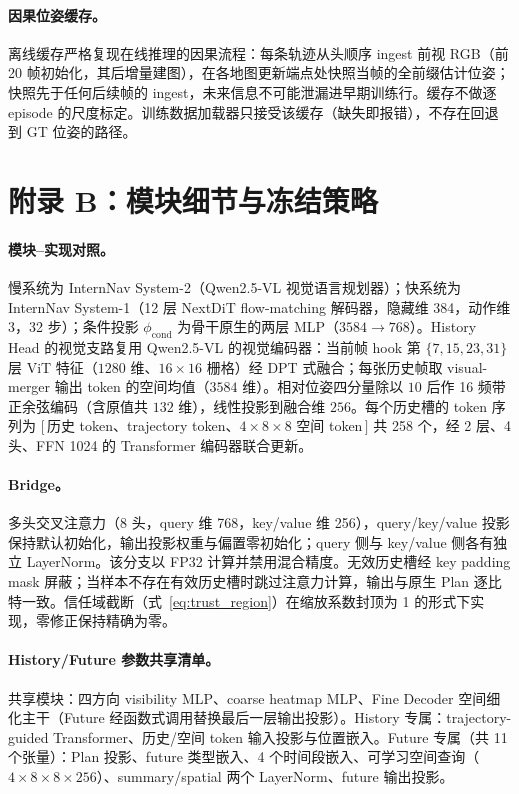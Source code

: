 \documentclass[10pt]{ctexart}
\begin{document}
\paragraph{因果位姿缓存。}
离线缓存严格复现在线推理的因果流程：每条轨迹从头顺序 ingest 前视 RGB（前 20 帧初始化，其后增量建图），在各地图更新端点处快照当帧的全前缀估计位姿；快照先于任何后续帧的 ingest，未来信息不可能泄漏进早期训练行。缓存不做逐 episode 的尺度标定。训练数据加载器只接受该缓存（缺失即报错），不存在回退到 GT 位姿的路径。

\section*{附录 B：模块细节与冻结策略}

\paragraph{模块--实现对照。}
慢系统为 InternNav System-2（Qwen2.5-VL 视觉语言规划器）；快系统为 InternNav System-1（12 层 NextDiT flow-matching 解码器，隐藏维 384，动作维 3，32 步）；条件投影 $\phi_{\mathrm{cond}}$ 为骨干原生的两层 MLP（$3584\!\to\!768$）。History Head 的视觉支路复用 Qwen2.5-VL 的视觉编码器：当前帧 hook 第 $\{7,15,23,31\}$ 层 ViT 特征（$1280$ 维、$16\times16$ 栅格）经 DPT 式融合；每张历史帧取 visual-merger 输出 token 的空间均值（$3584$ 维）。相对位姿四分量除以 $10$ 后作 16 频带正余弦编码（含原值共 $132$ 维），线性投影到融合维 $256$。每个历史槽的 token 序列为 $[\,$历史 token、trajectory token、$4\times8\times8$ 空间 token$\,]$ 共 258 个，经 2 层、4 头、FFN 1024 的 Transformer 编码器联合更新。

\paragraph{Bridge。}
多头交叉注意力（8 头，query 维 768，key/value 维 256），query/key/value 投影保持默认初始化，输出投影权重与偏置零初始化；query 侧与 key/value 侧各有独立 LayerNorm。该分支以 FP32 计算并禁用混合精度。无效历史槽经 key padding mask 屏蔽；当样本不存在有效历史槽时跳过注意力计算，输出与原生 Plan 逐比特一致。信任域截断（式~\ref{eq:trust_region}）在缩放系数封顶为 1 的形式下实现，零修正保持精确为零。

\paragraph{History/Future 参数共享清单。}
共享模块：四方向 visibility MLP、coarse heatmap MLP、Fine Decoder 空间细化主干（Future 经函数式调用替换最后一层输出投影）。History 专属：trajectory-guided Transformer、历史/空间 token 输入投影与位置嵌入。Future 专属（共 11 个张量）：Plan 投影、future 类型嵌入、4 个时间段嵌入、可学习空间查询（$4\times8\times8\times256$）、summary/spatial 两个 LayerNorm、future 输出投影。
\end{document}
